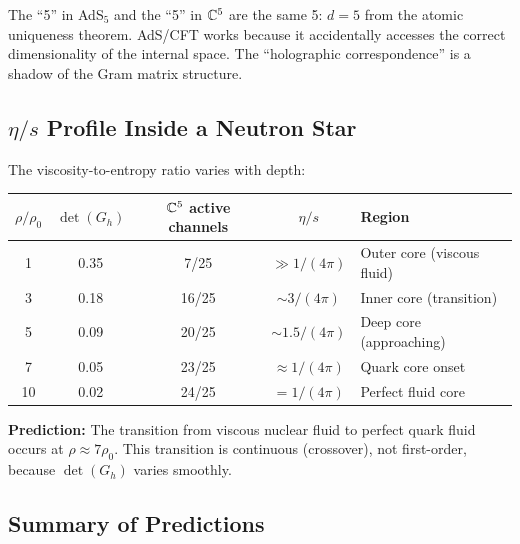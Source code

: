 \begin{remark}
The ``5'' in AdS$_5$ and the ``5'' in $\mathbb{C}^5$ are the same 5: $d = 5$ from the atomic uniqueness theorem. AdS/CFT works because it accidentally accesses the correct dimensionality of the internal space. The ``holographic correspondence'' is a shadow of the Gram matrix structure.
\end{remark}

\subsection{$\eta/s$ Profile Inside a Neutron Star}

The viscosity-to-entropy ratio varies with depth:

\begin{center}
\begin{tabular}{ccccl}
\hline
$\rho/\rho_0$ & $\det(G_h)$ & $\mathbb{C}^5$ active channels & $\eta/s$ & Region \\
\hline
1 & 0.35 & 7/25 & $\gg 1/(4\pi)$ & Outer core (viscous fluid) \\
3 & 0.18 & 16/25 & $\sim 3/(4\pi)$ & Inner core (transition) \\
5 & 0.09 & 20/25 & $\sim 1.5/(4\pi)$ & Deep core (approaching) \\
7 & 0.05 & 23/25 & $\approx 1/(4\pi)$ & Quark core onset \\
10 & 0.02 & 24/25 & $= 1/(4\pi)$ & Perfect fluid core \\
\hline
\end{tabular}
\end{center}

\textbf{Prediction:} The transition from viscous nuclear fluid to perfect quark fluid occurs at $\rho \approx 7\rho_0$. This transition is continuous (crossover), not first-order, because $\det(G_h)$ varies smoothly.

\subsection{Summary of Predictions}

